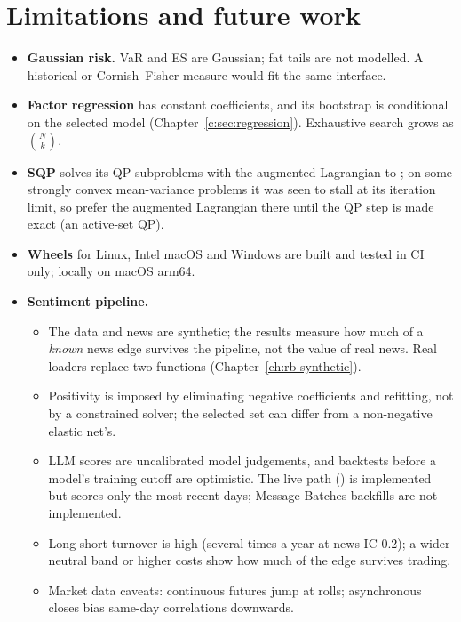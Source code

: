 \chapter{Limitations and future work}\label{c:sec:limitations}
\begin{itemize}
  \item \textbf{Gaussian risk.} VaR and ES are Gaussian; fat tails are not modelled. A historical or Cornish--Fisher
        measure would fit the same interface.
  \item \textbf{Factor regression} has constant coefficients, and its bootstrap is conditional on the selected model
        (Chapter~\ref{c:sec:regression}). Exhaustive search grows as $\binom Nk$.
  \item \textbf{SQP} solves its QP subproblems with the augmented Lagrangian to ; on some strongly
        convex mean-variance problems it was seen to stall at its iteration limit, so prefer the augmented Lagrangian
        there until the QP step is made exact (an active-set QP).
  \item \textbf{Wheels} for Linux, Intel macOS and Windows are built and tested in CI only; locally on macOS arm64.
  \item \textbf{Sentiment pipeline.}
        \begin{itemize}
          \item The data and news are synthetic; the results measure how much of a \emph{known} news edge survives
                the pipeline, not the value of real news. Real loaders replace two functions
                (Chapter~\ref{ch:rb-synthetic}).
          \item Positivity is imposed by eliminating negative coefficients and refitting, not by a constrained
                solver; the selected set can differ from a non-negative elastic net's.
          \item LLM scores are uncalibrated model judgements, and backtests before a model's training cutoff are
                optimistic. The live path () is implemented but scores only the most recent days;
                Message Batches backfills are not implemented.
          \item Long-short turnover is high (several times a year at news IC 0.2); a wider neutral band or higher
                costs show how much of the edge survives trading.
          \item Market data caveats: continuous futures jump at rolls; asynchronous closes bias same-day correlations
                downwards.
        \end{itemize}
\end{itemize}
